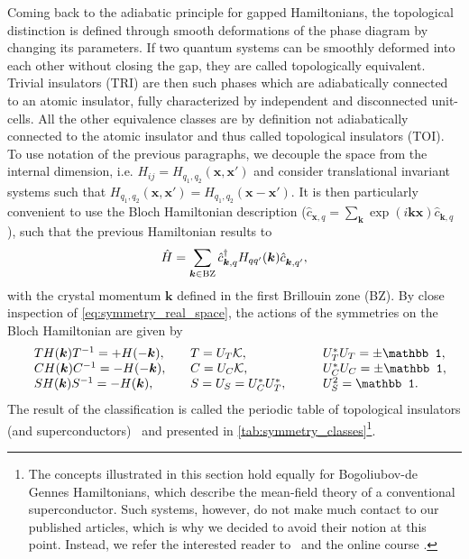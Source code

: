 Coming back to the adiabatic principle for gapped Hamiltonians, the topological distinction is defined through smooth deformations of the phase diagram by changing its parameters.
If two quantum systems can be smoothly deformed into each other without closing the gap, they are called topologically equivalent.
Trivial insulators (TRI) are then such phases which are adiabatically connected to an atomic insulator, fully characterized by independent and disconnected unit-cells.
All the other equivalence classes are by definition not adiabatically connected to the atomic insulator and thus called topological insulators (TOI).
To use notation of the previous paragraphs, we decouple the space from the internal dimension, i.e. $H_{ij}=H_{q_1,q_2}(\bm x,\bm x')$ and consider translational invariant systems such that $H_{q_1,q_2}(\bm x,\bm x')=H_{q_1,q_2}(\bm x-\bm x')$.
It is then particularly convenient to use the Bloch Hamiltonian description ($\hat c_{\bm x,q}=\sum_{\bm k}\exp(i\bm k\bm x)\hat c_{{\bm k},q}$), such that the previous Hamiltonian results to
\begin{align}
    \hat H = \sum_{\bm k\in {\rm BZ}} \hat c^\dag_{{\bm k},q} H_{qq'}(\bm k)\hat c^\pdag_{{\bm k},q'},
\end{align}
with the crystal momentum $\bm k$ defined in the first Brillouin zone (BZ).
By close inspection of \cref{eq:symmetry_real_space}, the actions of the symmetries on the Bloch Hamiltonian are given by
\begin{align}
    \begin{array}{l l l l }
        & TH(\bm k)T^{-1} = +H(-\bm k)
        ,\quad
        & T = U_T\mathcal K
        ,\quad
        & U_T^*U_T = \pm\mathbb1,\\
        & CH(\bm k)C^{-1} = -H(-\bm k)
        ,\quad
        & C = U_C\mathcal K
        ,\quad
        & U_C^*U_C = \pm\mathbb1,\\
        & SH(\bm k)S^{-1} = -H(\bm k)
        ,\quad
        & S = U_S = U_C^* U^*_T
        ,\qquad
        & U_S^2 = \mathbb1.
    \end{array}
    \label{eq:symmetry_momentum_space}
\end{align}
The result of the classification is called the periodic table of topological insulators (and superconductors)~\cite{Kitaev2009,Qi2008,Ryu2010,Schnyder2008} and presented in \cref{tab:symmetry_classes}\footnote{The concepts illustrated in this section hold equally for Bogoliubov-de Gennes Hamiltonians, which describe the mean-field theory of a conventional superconductor. Such systems, however, do not make much contact to our published articles, which is why we decided to avoid their notion at this point. Instead, we refer the interested reader to~\cite{Chiu2016,Asboth2016} and the online course \cite{topocondmat}.}.

